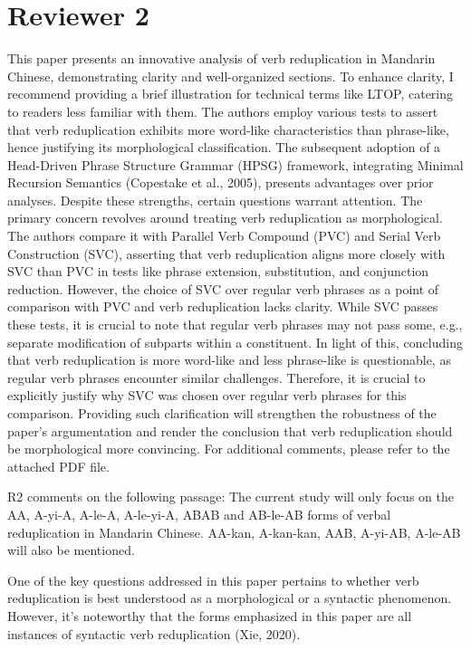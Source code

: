 \documentclass[fleqn,twoside]{article}
\begin{document}
{\section{Reviewer 2}

This paper presents an innovative analysis of verb reduplication in Mandarin Chinese, demonstrating
clarity and well-organized sections. To enhance clarity, I recommend providing a brief illustration for
technical terms like LTOP, catering to readers less familiar with them.
The authors employ various tests to assert that verb reduplication exhibits more word-like
characteristics than phrase-like, hence justifying its morphological classification. The subsequent
adoption of a Head-Driven Phrase Structure Grammar (HPSG) framework, integrating Minimal
Recursion Semantics (Copestake et al., 2005), presents advantages over prior analyses.
Despite these strengths, certain questions warrant attention. The primary concern revolves around
treating verb reduplication as morphological. The authors compare it with Parallel Verb Compound
(PVC) and Serial Verb Construction (SVC), asserting that verb reduplication aligns more closely with
SVC than PVC in tests like phrase extension, substitution, and conjunction reduction. However, the
choice of SVC over regular verb phrases as a point of comparison with PVC and verb reduplication
lacks clarity. While SVC passes these tests, it is crucial to note that regular verb phrases may not pass
some, e.g., separate modification of subparts within a constituent.
In light of this, concluding that verb reduplication is more word-like and less phrase-like is
questionable, as regular verb phrases encounter similar challenges. Therefore, it is crucial to
explicitly justify why SVC was chosen over regular verb phrases for this comparison. Providing such
clarification will strengthen the robustness of the paper's argumentation and render the conclusion
that verb reduplication should be morphological more convincing.
For additional comments, please refer to the attached PDF file.


R2 comments on the following passage: The current study will only focus on the AA, A-yi-A, A-le-A, A-le-yi-A, ABAB and
AB-le-AB forms of verbal reduplication in Mandarin Chinese. AA-kan, A-kan-kan,
AAB, A-yi-AB, A-le-AB will also be mentioned.

One of the key questions addressed in this paper pertains to whether verb reduplication is best understood as a morphological or a syntactic phenomenon. However, it's noteworthy that the forms emphasized in this paper are all instances of syntactic verb reduplication (Xie, 2020). 

}
\end{document}
